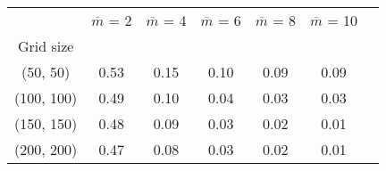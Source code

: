 \begin{tabular}{ccccccc}
\toprule
{} &  $\overline{m}$ = 2 &  $\overline{m}$ = 4 &  $\overline{m}$ = 6 &  $\overline{m}$ = 8 &  $\overline{m}$ = 10 \\
Grid size  &                     &                     &                     &                     &                      \\
\midrule
(50, 50)   &                0.53 &                0.15 &                0.10 &                0.09 &                 0.09 \\
(100, 100) &                0.49 &                0.10 &                0.04 &                0.03 &                 0.03 \\
(150, 150) &                0.48 &                0.09 &                0.03 &                0.02 &                 0.01 \\
(200, 200) &                0.47 &                0.08 &                0.03 &                0.02 &                 0.01 \\
\bottomrule
\end{tabular}
